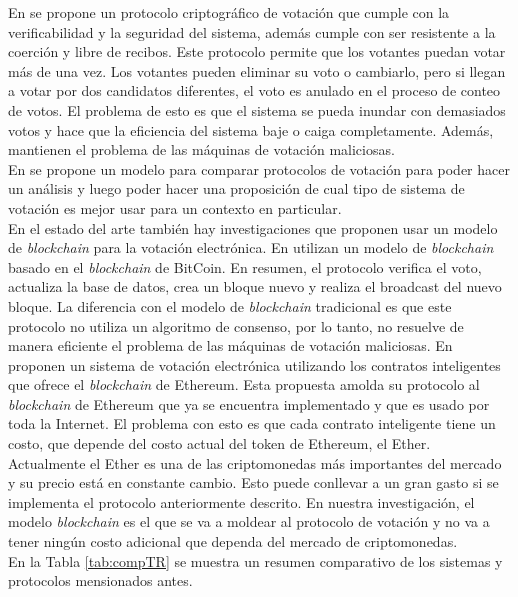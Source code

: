 En \cite{locher2016coercion} se propone un protocolo criptográfico de votación que cumple con la verificabilidad y la seguridad del sistema, además cumple con ser resistente a la coerción y libre de recibos. Este protocolo permite que los votantes puedan votar más de una vez. Los votantes pueden eliminar su voto o cambiarlo, pero si llegan a votar por dos candidatos diferentes, el voto es anulado en el proceso de conteo de votos. El problema de esto es que el sistema se pueda inundar con demasiados votos y hace que la eficiencia del sistema baje o caiga completamente. Además, mantienen el problema de las máquinas de votación maliciosas. \\
En \cite{neumann2016secivo} se propone un modelo para comparar protocolos de votación para poder hacer un análisis y luego poder hacer una proposición de cual tipo de sistema de votación es mejor usar para un contexto en particular. \\
En el estado del arte también hay investigaciones que proponen usar un modelo de \textit{blockchain} para la votación electrónica. En \cite{hanifatunnisa2017blockchain} utilizan un modelo de \textit{blockchain} basado en el \textit{blockchain} de BitCoin. En resumen, el protocolo verifica el voto, actualiza la base de datos, crea un bloque nuevo y realiza el broadcast del nuevo bloque.
La diferencia con el modelo de \textit{blockchain} tradicional es que este protocolo no utiliza un algoritmo de consenso, por lo tanto, no resuelve de manera eficiente el problema de las máquinas de votación maliciosas.
En \cite{mccorry2017smart} proponen un sistema de votación electrónica utilizando los contratos inteligentes que ofrece el \textit{blockchain} de Ethereum. Esta propuesta amolda su protocolo al \textit{blockchain} de Ethereum que ya se encuentra implementado y que es usado por toda la Internet. El problema con esto es que cada contrato inteligente tiene un costo, que depende del costo actual del token de Ethereum, el Ether. Actualmente el Ether es una de las criptomonedas más importantes del mercado \cite{nofer2017blockchain} y su precio está en constante cambio. Esto puede conllevar a un gran gasto si se implementa el protocolo anteriormente descrito. En nuestra investigación, el modelo \textit{blockchain} es el que se va a moldear al protocolo de votación y no va a tener ningún costo adicional que dependa del mercado de criptomonedas. \\
En la Tabla \ref{tab:compTR} se muestra un resumen comparativo de los sistemas y protocolos mensionados antes.


